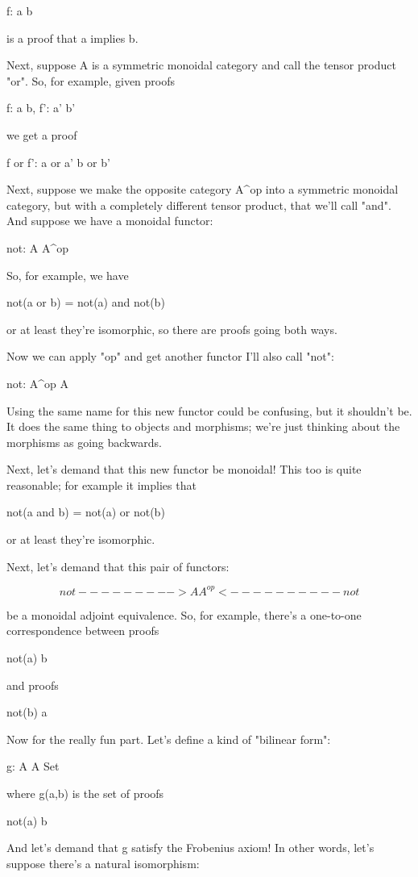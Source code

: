 f: a \to  b


is a proof that a implies b. 

Next, suppose A is a symmetric monoidal category and call the tensor
product "or".  So, for example, given proofs

f: a \to  b,  f': a' \to  b'

we get a proof

f or f': a or a' \to  b or b'


Next, suppose we make the opposite category A^{op} into a
symmetric monoidal category, but with a completely different tensor
product, that we'll call "and".  And suppose we have a
monoidal functor:

not: A \to  A^{op}

So, for example, we have

not(a or b) = not(a) and not(b)

or at least they're isomorphic, so there are proofs going both ways.  

Now we can apply "op" and get another functor I'll also call
"not":

not: A^{op} \to  A

Using the same name for this new functor could be confusing, but it 
shouldn't be.  It does the same thing to objects and morphisms; we're
just thinking about the morphisms as going backwards.
 
Next, let's demand that this new functor be monoidal!  This too is 
quite reasonable; for example it implies that

not(a and b) = not(a) or not(b)

or at least they're isomorphic.

Next, let's demand that this pair of functors:

$$
      not
   --------->
A             A^{op}
  <----------
      not

$$
    
be a monoidal adjoint equivalence.  So, for example, there's a
one-to-one correspondence between proofs

not(a) \to  b

and proofs

not(b) \to  a

Now for the really fun part.
Let's define a kind of "bilinear form":

g: A \times  A \to  Set

where g(a,b) is the set of proofs 

not(a) \to  b

And let's demand that g satisfy the Frobenius
axiom!  In other words, let's suppose there's a natural
isomorphism:

